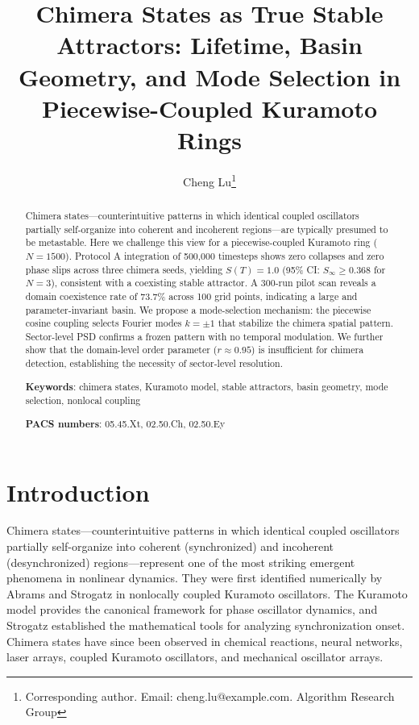 \documentclass[12pt]{article}
\begin{document}
\title{Chimera States as True Stable Attractors: Lifetime, Basin Geometry, and Mode Selection in Piecewise-Coupled Kuramoto Rings}

\author{Cheng Lu\thanks{Corresponding author. Email: cheng.lu@example.com. Algorithm Research Group}}

\begin{abstract}
Chimera states---counterintuitive patterns in which identical coupled oscillators partially self-organize into coherent and incoherent regions---are typically presumed to be metastable. Here we challenge this view for a piecewise-coupled Kuramoto ring ($N = 1500$). Protocol A integration of 500,000 timesteps shows zero collapses and zero phase slips across three chimera seeds, yielding $S(T) = 1.0$ (95\% CI: $S_\infty \geq 0.368$ for $N=3$), consistent with a coexisting stable attractor. A 300-run pilot scan reveals a domain coexistence rate of 73.7\% across 100 grid points, indicating a large and parameter-invariant basin. We propose a mode-selection mechanism: the piecewise cosine coupling selects Fourier modes $k=\pm 1$ that stabilize the chimera spatial pattern. Sector-level PSD confirms a frozen pattern with no temporal modulation. We further show that the domain-level order parameter ($r \approx 0.95$) is insufficient for chimera detection, establishing the necessity of sector-level resolution.

\noindent\textbf{Keywords}: chimera states, Kuramoto model, stable attractors, basin geometry, mode selection, nonlocal coupling

\noindent\textbf{PACS numbers}: 05.45.Xt, 02.50.Ch, 02.50.Ey
\end{abstract}

\maketitle

\section{Introduction}\label{sec:intro}

Chimera states---counterintuitive patterns in which identical coupled oscillators partially self-organize into coherent (synchronized) and incoherent (desynchronized) regions---represent one of the most striking emergent phenomena in nonlinear dynamics. They were first identified numerically by Abrams and Strogatz \cite{abrams2004} in nonlocally
coupled Kuramoto oscillators. The Kuramoto model \cite{kuramoto1975} provides the
canonical framework for phase oscillator dynamics, and Strogatz \cite{strogatz2000}
established the mathematical tools for analyzing synchronization onset.
Chimera states have since been observed in chemical reactions, neural networks, laser arrays, coupled Kuramoto oscillators, and mechanical oscillator arrays.
\end{document}
